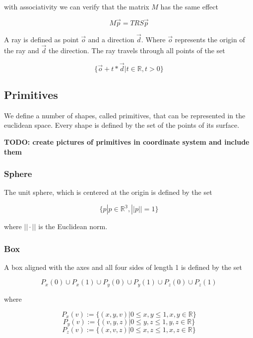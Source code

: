with associativity we can verify that the matrix $M$ has the same effect

\[
  M\vec{p} = TRS\vec{p}
\]


A ray is defined as point $\vec{o}$ and a direction $\vec{d}$. Where
$\vec{o}$ represents the origin of the ray and $\vec{d}$ the direction.
The ray travels through all points of the set

\[
 \{ \vec{o} + t * \vec{d} | t \in \mathbb{R}, t > 0 \}
\]

\subsection{Primitives}\label{primitives}

We define a number of shapes, called primitives, that can be represented
in the euclidean space. Every shape is defined by the set of the points
of its surface.

\textbf{TODO: create pictures of primitives in coordinate system and
include them}

\subsubsection{Sphere}\label{sphere}

The unit sphere, which is centered at the origin is defined by the set

\[
  \{p | p \in \mathbb{R^3}, ||p|| = 1 \}
\]

where $||\cdot||$ is the Euclidean norm.

\subsubsection{Box}\label{box}

A box aligned with the axes and all four sides of length 1 is defined by
the set

\[
  P_x(0) \cup P_x(1) \cup P_y(0) \cup P_y(1) \cup P_z(0) \cup P_z(1)
\]

where

\[
  P_x(v) := \{(x,y,v) | 0 \le x,y \le 1, x,y \in \mathbb{R}\}
\] \[
  P_y(v) := \{(v,y,z) | 0 \le y,z \le 1, y,z \in \mathbb{R}\}
\] \[
  P_z(v) := \{(x,v,z) | 0 \le x,z \le 1, x,z \in \mathbb{R}\}  
\]

